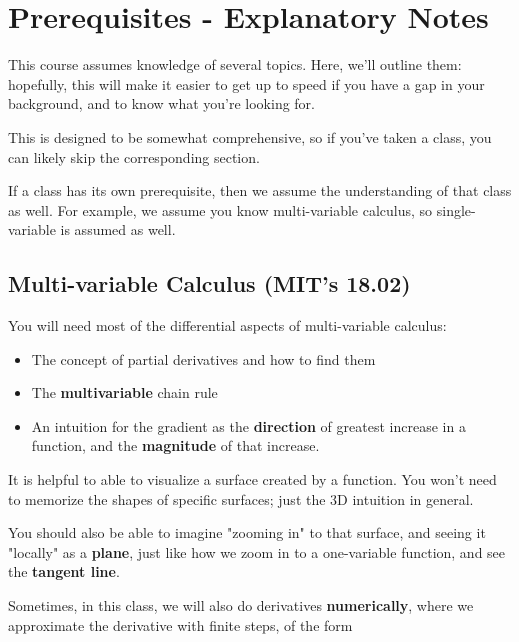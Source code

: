 
\setcounter{chapter}{-1} %

\chapter{Prerequisites - Explanatory Notes}
\label{prerequisites}



    
This course assumes knowledge of several topics. Here, we'll outline them: hopefully, this will make it easier to get up to speed if you have a gap in your background, and to know what you're looking for.

This is designed to be somewhat comprehensive, so if you've taken a class, you can likely skip the corresponding section.

If a class has its own prerequisite, then we assume the understanding of that class as well. For example, we assume you know multi-variable calculus, so single-variable is assumed as well.
    
\section{Multi-variable Calculus (MIT's 18.02)}

    You will need most of the differential aspects of multi-variable calculus: 
    
    \begin{itemize}
        \item The concept of partial derivatives and how to find them
        \item The \textbf{multivariable} chain rule
        \item An intuition for the gradient as the \textbf{direction} of greatest increase in a function, and the \textbf{magnitude} of that increase.
    \end{itemize}
    
    It is helpful to able to visualize a surface created by a function. You won't need to memorize the shapes of specific surfaces; just the 3D intuition in general.
    
    You should also be able to imagine "zooming in" to that surface, and seeing it "locally" as a \textbf{plane}, just like how we zoom in to a one-variable function, and see the \textbf{tangent line}.
    
    Sometimes, in this class, we will also do derivatives \textbf{numerically}, where we approximate the derivative with finite steps, of the form
    
